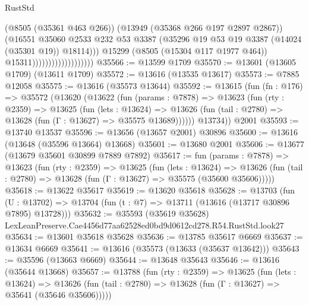 \begin{lexlean}{RustStd}
\begin{coremodule}
                                            (@8505 (@35361 @463 @266))
                                            (@13949 (@35368 @266 @197 @2897 @2867))
                                            (@16551
                                              @35060
                                              @2533
                                              @232
                                              @53
                                              @3387
                                              (@35296
                                                @19
                                                @53
                                                @19
                                                @3387
                                                (@14024 (@35301 @19))
                                                @18114)))
                                          @15299
                                          (@8505 (@15304 @117 @1977 @464))
                                          @15311)))))))))))))))))))
@35566 := @13599 @1709
@35570 := @13601 (@13605 @1709) (@13611 @1709)
@35572 := @13616 (@13535 @13617)
@35573 := @7885 @12058
@35575 := @13616 (@35573 @13644)
@35592 := @13615
    (fun (fn : @176) =>
    @35572
      (@13620
        (@13622
          (fun (params : @7878) =>
          @13623
            (fun (rty : @2359) =>
            @13625
              (fun (lets : @13624) =>
              @13626 (fun (tail : @2780) => @13628 (fun (Γ : @13627) => @35575 @13689))))))
        @13734))
    @2001
@35593 := @13740 @13537
@35596 := @13656 (@13657 @2001) @30896
@35600 := @13616 (@13648 (@35596 @13664) @13668)
@35601 := @13680 @2001
@35606 := @13677 (@13679 @35601 @30899 @7889 @7892)
@35617 := fun (params : @7878) =>
  @13623
    (fun (rty : @2359) =>
    @13625
      (fun (lets : @13624) =>
      @13626 (fun (tail : @2780) => @13628 (fun (Γ : @13627) => @35575 (@35600 @35606)))))
@35618 := @13622 @35617
@35619 := @13620 @35618
@35628 := @13703
    (fun (U : @13702) => @13704 (fun (t : @7) => @13711 (@13616 (@13717 @30896 @7895) @13728)))
@35632 := @35593
    (@35619 @35628)
    LexLeanPreserve.Cae4456d77aa62528ed0bd9d0612cd278.R54.RustStd.look27
@35634 := @13601 @35618 @35628
@35636 := @13785 @35617 @6669
@35637 := @13634 @6669
@35641 := @13616 (@35573 (@13633 (@35637 @13642)))
@35643 := @35596 (@13663 @6669)
@35644 := @13648 @35643
@35646 := @13616 (@35644 @13668)
@35657 := @13788
    (fun (rty : @2359) =>
    @13625
      (fun (lets : @13624) =>
      @13626 (fun (tail : @2780) => @13628 (fun (Γ : @13627) => @35641 (@35646 @35606)))))

\end{coremodule}
\end{lexlean}
